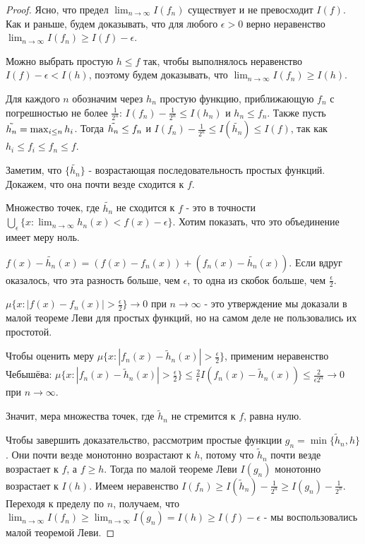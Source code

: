 \documentclass[a4paper]{article}
\theoremstyle{indented}
\theoremstyle{definition}
\theoremstyle{remark}
\DeclareMathOperator{\ra}{\rightarrow}
\begin{document}
\begin{proof}
Ясно, что предел $\lim_{n \ra \infty} I(f_n)$ существует и не превосходит $I(f)$. Как и раньше, будем доказывать, что для любого $\epsilon>0$ верно неравенство $\lim_{n \ra \infty} I(f_n) \geq I(f)-\epsilon$.
 
Можно выбрать простую $h \leq f$ так, чтобы выполнялось неравенство $I(f)-\epsilon < I(h)$, поэтому будем доказывать, что $\lim_{n \ra \infty} I(f_n) \geq I(h)$.
 
Для каждого $n$ обозначим через $h_n$ простую функцию, приближающую $f_n$ с погрешностью не более $\frac{1}{2^n}$: $I(f_n)-\frac{1}{2^n} \leq I(h_n)$ и $h_n \leq f_n$. Также пусть $\Tilde{h_n} = \max_{i \leq n}h_i$. Тогда $\Tilde{h_n} \leq f_n$ и $I(f_n)-\frac{1}{2^n} \leq I(\tilde{h_n}) \leq I(f)$, так как $h_i \leq f_i \leq f_n \leq f$.
 
Заметим, что $\{\tilde{h_n}\}$ - возрастающая последовательность простых функций. Докажем, что она почти везде сходится к $f$.
 
Множество точек, где $\tilde{h_n}$ не сходится к $f$ - это в точности $\bigcup_{\epsilon} \{x: \lim_{n \ra \infty} h_n(x)<f(x)-\epsilon\}$. Хотим показать, что это объединение имеет меру ноль.
 
$f(x)-\tilde{h_n}(x) = (f(x)-f_n(x))+(f_n(x)-\tilde{h_n}(x))$. Если вдруг оказалось, что эта разность больше, чем $\epsilon$, то одна из скобок больше, чем $\frac{\epsilon}{2}$.
 
$\mu\{x: |f(x)-f_n(x)|>\frac{\epsilon}{2}\} \ra 0$ при $n \ra \infty$ - это утверждение мы доказали в малой теореме Леви для простых функций, но на самом деле не пользовались их простотой.
 
Чтобы оценить меру $\mu\{x: |f_n(x)-\tilde{h}_n(x)|>\frac{\epsilon}{2}\}$, применим неравенство Чебышёва: $\mu\{x: |f_n(x)-\tilde{h}_n(x)|>\frac{\epsilon}{2}\} \leq \frac{2}{\epsilon} I \left ( f_n(x)-\tilde{h}_n(x) \right ) \leq \frac{2}{\epsilon 2^n} \ra 0$ при $n \ra \infty$.
 
Значит, мера множества точек, где $\tilde{h}_n$ не стремится к $f$, равна нулю.
 
Чтобы завершить доказательство, рассмотрим простые функции $g_n=\min\{\tilde{h}_n, h\}$. Они почти везде монотонно возрастают к $h$, потому что $\tilde{h}_n$ почти везде возрастает к $f$, а $f \geq h$. Тогда по малой теореме Леви $I(g_n)$ монотонно возрастает к $I(h)$. Имеем неравенство $I(f_n) \geq I(\tilde{h}_n)-\frac{1}{2^n} \geq I(g_n)-\frac{1}{2^n}$. Переходя к пределу по $n$, получаем, что $\lim_{n \ra \infty} I(f_n) \geq \lim_{n \ra \infty} I(g_n) = I(h) \geq I(f)-\epsilon$ - мы воспользовались малой теоремой Леви.
\end{proof}
\end{document}

